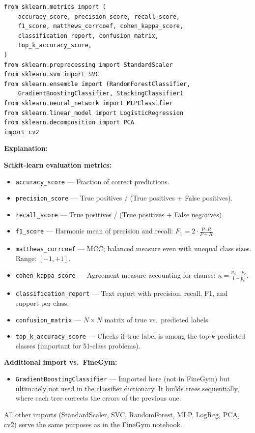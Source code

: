\documentclass[a4paper, 12pt]{article}
\newenvironment{explanation}{%
  \par\smallskip
  \noindent\textcolor{blue!70!black}{\textbf{Explanation:}}\\
  \noindent
}{\par\medskip}
\begin{document}
\begin{lstlisting}
from sklearn.metrics import (
    accuracy_score, precision_score, recall_score,
    f1_score, matthews_corrcoef, cohen_kappa_score,
    classification_report, confusion_matrix,
    top_k_accuracy_score,
)
from sklearn.preprocessing import StandardScaler
from sklearn.svm import SVC
from sklearn.ensemble import (RandomForestClassifier,
    GradientBoostingClassifier, StackingClassifier)
from sklearn.neural_network import MLPClassifier
from sklearn.linear_model import LogisticRegression
from sklearn.decomposition import PCA
import cv2
\end{lstlisting}

\begin{explanation}
\textbf{Scikit-learn evaluation metrics:}
\begin{itemize}[nosep]
  \item \texttt{accuracy\_score} --- Fraction of correct predictions.
  \item \texttt{precision\_score} --- True positives / (True positives + False positives).
  \item \texttt{recall\_score} --- True positives / (True positives + False negatives).
  \item \texttt{f1\_score} --- Harmonic mean of precision and recall: $F_1 = 2 \cdot \frac{P \cdot R}{P + R}$.
  \item \texttt{matthews\_corrcoef} --- MCC; balanced measure even with unequal class sizes. Range: $[-1, +1]$.
  \item \texttt{cohen\_kappa\_score} --- Agreement measure accounting for chance: $\kappa = \frac{p_o - p_e}{1 - p_e}$.
  \item \texttt{classification\_report} --- Text report with precision, recall, F1, and support per class.
  \item \texttt{confusion\_matrix} --- $N \times N$ matrix of true vs.\ predicted labels.
  \item \texttt{top\_k\_accuracy\_score} --- Checks if true label is among the top-$k$ predicted classes (important for 51-class problems).
\end{itemize}

\textbf{Additional import vs.\ FineGym:}
\begin{itemize}[nosep]
  \item \texttt{GradientBoostingClassifier} --- Imported here (not in FineGym) but ultimately not used in the classifier dictionary. It builds trees sequentially, where each tree corrects the errors of the previous one.
\end{itemize}

All other imports (StandardScaler, SVC, RandomForest, MLP, LogReg, PCA, cv2) serve the same purposes as in the FineGym notebook.
\end{explanation}
\end{document}
